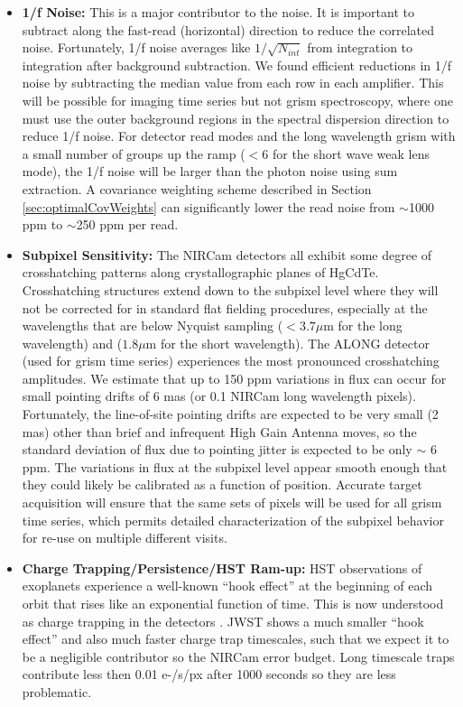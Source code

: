 \documentclass[]{aastex62}
\begin{document}
\begin{itemize}
	\item \textbf{1/f Noise:} This is a major contributor to the noise.
	It is important to subtract along the fast-read (horizontal) direction to reduce the correlated noise.
	Fortunately, 1/f noise averages like $1/\sqrt{N_{int}} $ from integration to integration after background subtraction.
	We found efficient reductions in 1/f noise by subtracting the median value from each row in each amplifier.
	This will be possible for imaging time series but not grism spectroscopy, where one must use the outer background regions in the spectral dispersion direction to reduce 1/f noise.
	For detector read modes and the long wavelength grism with a small number of groups up the ramp ($<6$ for the short wave weak lens mode), the 1/f noise will be larger than the photon noise using sum extraction.
	A covariance weighting scheme described in Section \ref{sec:optimalCovWeights} can significantly lower the read noise from $\sim$1000 ppm to $\sim$250 ppm per read.
	\item \textbf{Subpixel Sensitivity:} The NIRCam detectors all exhibit some degree of crosshatching patterns along crystallographic planes of HgCdTe.
	Crosshatching structures extend down to the subpixel level where they will not be corrected for in standard flat fielding procedures, especially at the wavelengths that are below Nyquist sampling ($< 3.7\mu$m for the long wavelength) and ($1.8\mu$m for the short wavelength).
	The ALONG detector (used for grism time series) experiences the most pronounced crosshatching amplitudes.
	We estimate that up to 150 ppm variations in flux can occur for small pointing drifts of 6 mas (or 0.1 NIRCam long wavelength pixels).
	Fortunately, the line-of-site pointing drifts are expected to be very small (2 mas) other than brief and infrequent High Gain Antenna moves, so the standard deviation of flux due to pointing jitter is expected to be only $\sim$ 6 ppm.
	The variations in flux at the subpixel level appear smooth enough that they could likely be calibrated as a function of position.
	Accurate target acquisition will ensure that the same sets of pixels will be used for all grism time series, which permits detailed characterization of the subpixel behavior for re-use on multiple different visits.
	\item \textbf{Charge Trapping/Persistence/HST Ram-up:} HST observations of exoplanets experience a well-known ``hook effect'' at the beginning of each orbit that rises like an exponential function of time.
	This is now understood as charge trapping in the detectors \citep{zhou2017chargeTrap}.
	JWST shows a much smaller ``hook effect'' and also much faster charge trap timescales, such that we expect it to be a negligible contributor so the NIRCam error budget.
	Long timescale traps contribute less then 0.01 e-/s/px after 1000 seconds so they are less problematic.
\end{itemize}
\end{document}
